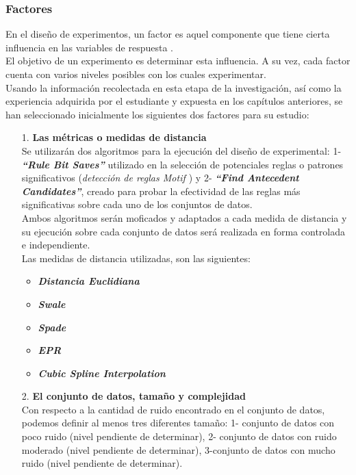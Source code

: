 \subsubsection{Factores}
En el dise\~no de experimentos, un factor es aquel componente que tiene cierta
influencia en las variables de respuesta \cite{montgomeryx}.\\
El objetivo de un experimento es determinar esta influencia. A su vez, cada factor cuenta con varios niveles posibles con los cuales experimentar.\\
Usando la informaci\'on recolectada en esta etapa de la investigaci\'on, as\'i como la experiencia adquirida por el estudiante y expuesta en los cap\'itulos anteriores, se han seleccionado inicialmente los siguientes dos factores para su estudio:
\begin{itemize}
\item [1.] \textbf{Las m\'etricas o medidas de distancia}\\
Se utilizar\'an dos algoritmos para la ejecuci\'on del dise\~no de experimental: 1- \textit{\textbf{\enquote{Rule Bit Saves}}} utilizado en la selecci\'on de potenciales reglas o patrones significativos (\textit{\textit{detecci\'on de reglas \textit{Motif \cite{main}}}}) y 2- \textit{\textbf{\enquote{Find Antecedent Candidates}}}, creado para probar la efectividad de las reglas m\'as significativas sobre cada uno de los conjuntos de datos.\\
Ambos algoritmos ser\'an moficados y adaptados a cada medida de distancia y su ejecuci\'on sobre cada conjunto de datos ser\'a realizada en forma controlada e independiente.\\
Las medidas de distancia utilizadas, son las siguientes:
\begin{itemize}
\item \textbf{\textit{Distancia Euclidiana}}
\item \textbf{\textit{Swale}}
\item \textbf{\textit{Spade}}
\item \textbf{\textit{EPR}}
\item \textbf{\textit{Cubic Spline Interpolation}}
\end{itemize}
\item [2.] \textbf{El conjunto de datos, tama\~no y complejidad}\\
Con respecto a la cantidad de ruido encontrado en el conjunto de datos, podemos definir al menos tres diferentes tama\~no: 1- conjunto de datos con poco ruido (nivel pendiente de determinar), 2- conjunto de datos con ruido moderado (nivel pendiente de determinar), 3-conjunto de datos con mucho ruido (nivel pendiente de determinar). \\

\end{itemize}

